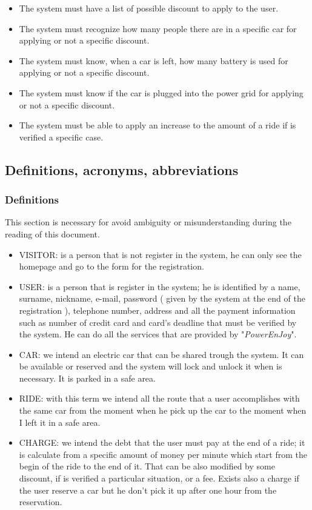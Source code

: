 \begin{itemize}
\item The system must have a list of possible discount to apply to the user.
\item The system must recognize how many people there are in a specific car for applying or not a specific discount.
\item The system must know, when a car is left, how many battery is used for applying or not a specific discount.
\item The system must know if the car is plugged into the power grid for applying or not a specific discount.
\item The system must be able to apply an increase to the amount of a ride if is verified a specific case.


\end{itemize}


\subsection{Definitions, acronyms, abbreviations} \label{subsec:def-ac-ab}

\subsubsection{Definitions} \label{def}
This section is necessary for avoid ambiguity or misunderstanding during the reading of this document. 
\begin{itemize}
\item VISITOR: is a person that is not register in the system, he can only see the homepage and go to the form for the registration.
\item USER: is a person that is register in the system; he is identified by a name, surname, nickname, e-mail, password ( given by the system at the end of the registration ), telephone number, address and all the payment information such as number of credit card and card's deadline that must be verified by the system. He can do all the services that are provided by "\emph{PowerEnJoy}".
\item CAR: we intend an electric car that can be shared trough the system. It can be available or reserved and the system will lock and unlock it when is necessary. It is parked in a safe area.
\item RIDE: with this term we intend all the route that a user accomplishes with the same car from the moment when he pick up the car to the moment when I left it in a safe area.   
\item CHARGE: we intend the debt that the user must pay at the end of a ride; it is calculate from a specific amount of money per minute which start from the begin of the ride to the end of it. That can be also modified  by some discount, if is verified a particular situation, or a fee. Exists also a charge if the user reserve a car but he don't pick it up after one hour from the reservation.  

\end{itemize}

